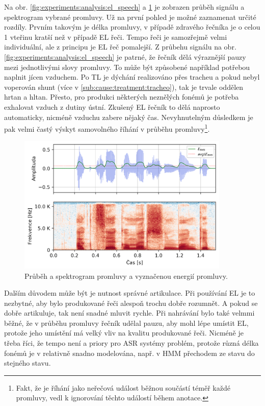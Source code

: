 Na obr. \ref{fig:experiments:analysis:el_speech} a \ref{fig:experiments:analysis:normal_speech} je zobrazen průběh signálu a spektrogram vybrané promluvy. Už na první pohled je možné zaznamenat určité rozdíly. Prvním takovým je délka promluvy, v případě zdravého řečníka je o celou 1 vteřinu kratší než v případě EL řeči. Tempo řeči je samozřejmě velmi individuální, ale z principu je EL řeč pomalejší. Z průbehu signálu na obr. \ref{fig:experiments:analysis:el_speech} je patrné, že řečník dělá výraznější pauzy mezi jednotlivými slovy promluvy. To může být způsobené například potřebou naplnit jícen vzduchem. Po TL je dýchání realizováno přes tracheu a pokud nebyl voperován shunt (více v \ref{sub:cause:treatment:tracheo}), tak je trvale oddělen hrtan a hltan. Přesto, pro produkci některých neznělých fonémů je potřeba exhalovat vzduch z dutiny ústní. Zkušený EL řečník to dělá naprosto automaticky, nicméně  vzduchu zabere nějaký čas. Nevyhnutelným důsledkem je pak velmi častý výskyt samovolného říhání v průběhu promluvy\footnote{Fakt, že je říhání jako neřečová událost běžnou součástí téměř každé promluvy, vedl k ignorování těchto událostí během anotace.}.

\begin{figure}[hbpt]
  \centering
  \includegraphics[width=0.9\textwidth]{./ch4-experiments/img/energy_spec_normal.png}
  \caption{Průběh a spektrogram promluvy a vyznačenou energií promluvy.}
  \label{fig:experiments:analysis:normal_speech}
\end{figure}

Dalším důvodem může být je nutnost správné artikulace. Při používání EL je to nezbytné, aby bylo produkované řeči alespoň trochu dobře rozumnět. A pokud se dobře artikuluje, tak není snadné mluvit rychle. Při nahrávání bylo také velmmi běžné, že v průběhu promluvy řečník udělal pauzu, aby mohl lépe umístit EL, protože jeho umístění má velký vliv na kvalitu produkované řeči. Nicméně je třeba říci, že tempo není a priory pro ASR systémy problém, protože různá délka fonémů je v relativně snadno modelována, např. v HMM přechodem ze stavu do stejného stavu.

